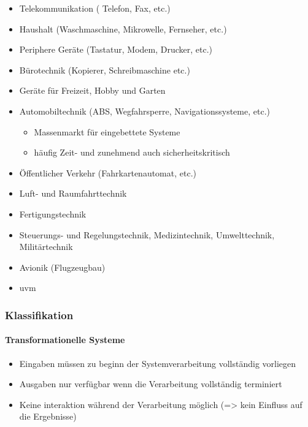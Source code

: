 \documentclass[
]{article}
\providecommand{\tightlist}{%
  \setlength{\itemsep}{0pt}\setlength{\parskip}{0pt}}
\begin{document}
\begin{itemize}
\tightlist
\item
  Telekommunikation ( Telefon, Fax, etc.)
\item
  Haushalt (Waschmaschine, Mikrowelle, Fernseher, etc.)
\item
  Periphere Geräte (Tastatur, Modem, Drucker, etc.)
\item
  Bürotechnik (Kopierer, Schreibmaschine etc.)
\item
  Geräte für Freizeit, Hobby und Garten
\item
  Automobiltechnik (ABS, Wegfahrsperre, Navigationssysteme, etc.)

  \begin{itemize}
  \tightlist
  \item
    Massenmarkt für eingebettete Systeme
  \item
    häufig Zeit- und zunehmend auch sicherheitskritisch
  \end{itemize}
\item
  Öffentlicher Verkehr (Fahrkartenautomat, etc.)
\item
  Luft- und Raumfahrttechnik
\item
  Fertigungstechnik
\item
  Steuerungs- und Regelungstechnik, Medizintechnik, Umwelttechnik,
  Militärtechnik
\item
  Avionik (Flugzeugbau)
\item
  uvm
\end{itemize}

\hypertarget{klassifikation}{%
\subsubsection{Klassifikation}\label{klassifikation}}

\hypertarget{transformationelle-systeme}{%
\paragraph{Transformationelle
Systeme}\label{transformationelle-systeme}}

\begin{itemize}
\tightlist
\item
  Eingaben müssen zu beginn der Systemverarbeitung vollständig vorliegen
\item
  Ausgaben nur verfügbar wenn die Verarbeitung vollständig terminiert
\item
  Keine interaktion während der Verarbeitung möglich (=\textgreater{}
  kein Einfluss auf die Ergebnisse)
\end{itemize}
\end{document}
